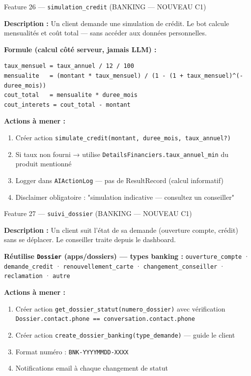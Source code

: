 \documentclass[11pt,a4paper]{article}
\newcommand{\slug}[1]{\texttt{\color{AGTDark}#1}}
\begin{document}
\begin{bankingfeaturebox}{Feature 26 — \slug{simulation\_credit} (BANKING — NOUVEAU C1)}

\textbf{Description :} Un client demande une simulation de crédit. Le bot calcule
mensualités et coût total — sans accéder aux données personnelles.

\textbf{Formule (calcul côté serveur, jamais LLM) :}
\begin{lstlisting}
taux_mensuel = taux_annuel / 12 / 100
mensualite   = (montant * taux_mensuel) / (1 - (1 + taux_mensuel)^(-duree_mois))
cout_total   = mensualite * duree_mois
cout_interets = cout_total - montant
\end{lstlisting}

\textbf{Actions à mener :}
\begin{enumerate}
  \item Créer action \slug{simulate\_credit(montant, duree\_mois, taux\_annuel?)}
  \item Si taux non fourni → utilise \slug{DetailsFinanciers.taux\_annuel\_min}
        du produit mentionné
  \item Logger dans \slug{AIActionLog} — pas de ResultRecord (calcul informatif)
  \item Disclaimer obligatoire : "simulation indicative — consultez un conseiller"
\end{enumerate}

\end{bankingfeaturebox}

\bigskip

\begin{bankingfeaturebox}{Feature 27 — \slug{suivi\_dossier} (BANKING — NOUVEAU C1)}

\textbf{Description :} Un client suit l'état de sa demande (ouverture compte, crédit)
sans se déplacer. Le conseiller traite depuis le dashboard.

\textbf{Réutilise \slug{Dossier} (apps/dossiers) — types banking :}
\texttt{ouverture\_compte} · \texttt{demande\_credit} · \texttt{renouvellement\_carte}
· \texttt{changement\_conseiller} · \texttt{reclamation} · \texttt{autre}

\textbf{Actions à mener :}
\begin{enumerate}
  \item Créer action \slug{get\_dossier\_statut(numero\_dossier)} avec vérification
        \slug{Dossier.contact.phone == conversation.contact.phone}
  \item Créer action \slug{create\_dossier\_banking(type\_demande)} — guide le client
  \item Format numéro : \texttt{BNK-YYYYMMDD-XXXX}
  \item Notifications email à chaque changement de statut
\end{enumerate}

\end{bankingfeaturebox}
\end{document}
